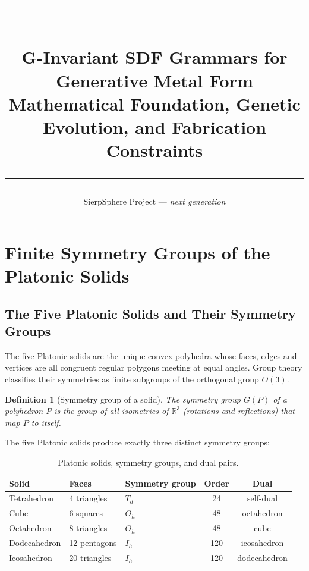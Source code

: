 \documentclass[11pt, a4paper]{article}
\title{%
  \textcolor{teal}{\rule{\linewidth}{0.8pt}}\\[0.4em]
  \textbf{G-Invariant SDF Grammars for Generative Metal Form}\\
  {\large Mathematical Foundation, Genetic Evolution, and Fabrication Constraints}\\[0.3em]
  \textcolor{teal}{\rule{\linewidth}{0.8pt}}
}
\author{SierpSphere Project — \textit{next generation}}
\date{}
\newtheorem{definition}{Definition}[section]
\newcommand{\R}{\mathbb{R}}
\newcommand{\Td}{T_d}
\newcommand{\Oh}{O_h}
\newcommand{\Ih}{I_h}
\begin{document}
\maketitle
\tableofcontents
\vspace{2em}

\section{Finite Symmetry Groups of the Platonic Solids}
\label{sec:groups}

\subsection{The Five Platonic Solids and Their Symmetry Groups}

The five Platonic solids are the unique convex polyhedra whose faces, edges
and vertices are all congruent regular polygons meeting at equal angles. Group
theory classifies their symmetries as finite subgroups of the orthogonal group
$O(3)$.

\begin{definition}[Symmetry group of a solid]
The \emph{symmetry group} $G(P)$ of a polyhedron $P$ is the group of all
isometries of $\R^3$ (rotations and reflections) that map $P$ to itself.
\end{definition}

The five Platonic solids produce exactly three distinct symmetry groups:

\begin{table}[h]
\centering
\begin{tabular}{lllcc}
\toprule
Solid & Faces & Symmetry group & Order & Dual \\
\midrule
Tetrahedron  & 4 triangles   & $\Td$  & 24  & self-dual \\
Cube         & 6 squares     & $\Oh$  & 48  & octahedron \\
Octahedron   & 8 triangles   & $\Oh$  & 48  & cube \\
Dodecahedron & 12 pentagons  & $\Ih$  & 120 & icosahedron \\
Icosahedron  & 20 triangles  & $\Ih$  & 120 & dodecahedron \\
\bottomrule
\end{tabular}
\caption{Platonic solids, symmetry groups, and dual pairs.}
\label{tab:platonic}
\end{table}
\end{document}
